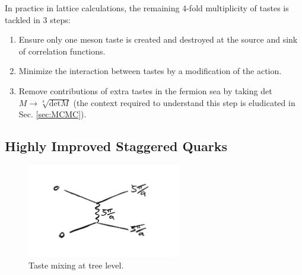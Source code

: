     In practice in lattice calculations, the remaining 4-fold multiplicity of tastes is tackled in 3 steps:
    \begin{enumerate}
    \item
      Ensure only one meson taste is created and destroyed at the source and sink of correlation functions. 
    \item
      Minimize the interaction between tastes by a modification of the action.
    \item
      Remove contributions of extra tastes in the fermion sea by taking det$M \to \sqrt[4]{\text{det}M}$ (the context required to understand this step is eludicated in Sec. \ref{sec:MCMC}).
    \end{enumerate}


    \subsection{Highly Improved Staggered Quarks}
    \label{sec:HISQ}

    \begin{figure}
      \vspace{-10pt}
      \begin{center}
        \includegraphics[width=
          0.6\textwidth]{images/taste_exchange.jpg}
      \end{center}
      \vspace{-30pt}
      \caption{Taste mixing at tree level.}
      \label{fig:tastemixing}
    \end{figure}

